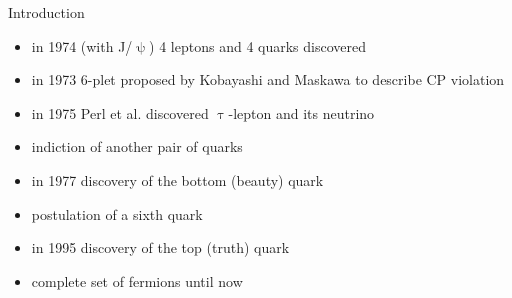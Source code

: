 \begin{frame}{Introduction}
	
	\begin{minipage}[c][.7\textheight]{.6\textwidth}
		\begin{itemize}
			\itemfill
			\item<1-> in 1974 (with J/$\uppsi$) 4 leptons and 4 quarks discovered
			\item<2-> in 1973 6-plet proposed by Kobayashi and Maskawa to describe CP violation
			\item<2-> in 1975 Perl et al. discovered $\uptau$-lepton and its neutrino
			\item<2-> indiction of another pair of quarks
			\item<3-> in 1977 discovery of the bottom (beauty) quark 
			\item<3-> postulation of a sixth quark
			\item<4-> in 1995 discovery of the top (truth) quark
			\item<4-> complete set of fermions until now
		\end{itemize}
	\end{minipage}
	\hfill
	\begin{minipage}{.37\textwidth}
	\end{minipage}


\end{frame}
